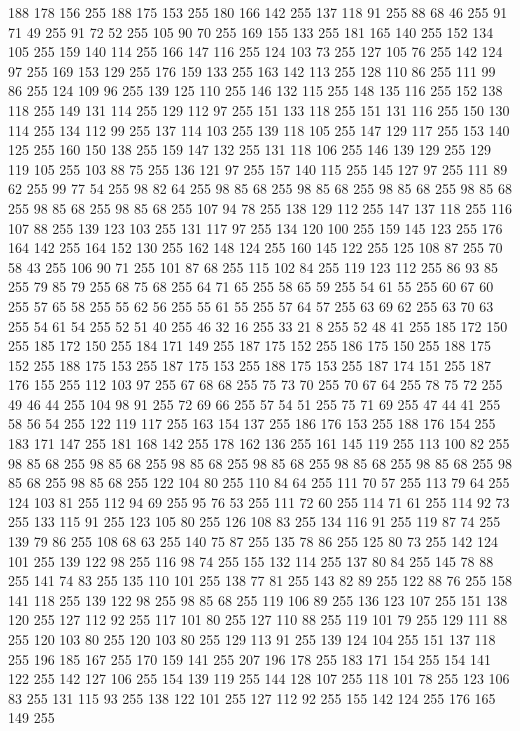 188 178 156 255 188 175 153 255 180 166 142 255 137 118 91 255 88 68 46 255 91 71 49 255 91 72 52 255 105 90 70 255 169 155 133 255 181 165 140 255 152 134 105 255 159 140 114 255 166 147 116 255 124 103 73 255 127 105 76 255 142 124 97 255 169 153 129 255 176 159 133 255 163 142 113 255 128 110 86 255 111 99 86 255 124 109 96 255 139 125 110 255 146 132 115 255 148 135 116 255 152 138 118 255 149 131 114 255 129 112 97 255 151 133 118 255 151 131 116 255 150 130 114 255 134 112 99 255 137 114 103 255 139 118 105 255 147 129 117 255 153 140 125 255 160 150 138 255 159 147 132 255 131 118 106 255 146 139 129 255 129 119 105 255 103 88 75 255 136 121 97 255 157 140 115 255 145 127 97 255 111 89 62 255 99 77 54 255 98 82 64 255 98 85 68 255 98 85 68 255 98 85 68 255 98 85 68 255 98 85 68 255 98 85 68 255 107 94 78 255 138 129 112 255 147 137 118 255 116 107 88 255 139 123 103 255 131 117 97 255 134 120 100 255 159 145 123 255 176 164 142 255 164 152 130 255
162 148 124 255 160 145 122 255 125 108 87 255 70 58 43 255 106 90 71 255 101 87 68 255 115 102 84 255 119 123 112 255 86 93 85 255 79 85 79 255 68 75 68 255 64 71 65 255 58 65 59 255 54 61 55 255 60 67 60 255 57 65 58 255 55 62 56 255 55 61 55 255 57 64 57 255 63 69 62 255 63 70 63 255 54 61 54 255 52 51 40 255 46 32 16 255 33 21 8 255 52 48 41 255 185 172 150 255 185 172 150 255 184 171 149 255 187 175 152 255 186 175 150 255 188 175 152 255 188 175 153 255 187 175 153 255 188 175 153 255 187 174 151 255 187 176 155 255 112 103 97 255 67 68 68 255 75 73 70 255 70 67 64 255 78 75 72 255 49 46 44 255 104 98 91 255 72 69 66 255 57 54 51 255 75 71 69 255 47 44 41 255 58 56 54 255 122 119 117 255 163 154 137 255 186 176 153 255 188 176 154 255 183 171 147 255 181 168 142 255 178 162 136 255 161 145 119 255 113 100 82 255 98 85 68 255 98 85 68 255 98 85 68 255 98 85 68 255 98 85 68 255 98 85 68 255
98 85 68 255 98 85 68 255 122 104 80 255 110 84 64 255 111 70 57 255 113 79 64 255 124 103 81 255 112 94 69 255 95 76 53 255 111 72 60 255 114 71 61 255 114 92 73 255 133 115 91 255 123 105 80 255 126 108 83 255 134 116 91 255 119 87 74 255 139 79 86 255 108 68 63 255 140 75 87 255 135 78 86 255 125 80 73 255 142 124 101 255 139 122 98 255 116 98 74 255 155 132 114 255 137 80 84 255 145 78 88 255 141 74 83 255 135 110 101 255 138 77 81 255 143 82 89 255 122 88 76 255 158 141 118 255 139 122 98 255 98 85 68 255 119 106 89 255 136 123 107 255 151 138 120 255 127 112 92 255 117 101 80 255 127 110 88 255 119 101 79 255 129 111 88 255 120 103 80 255 120 103 80 255 129 113 91 255 139 124 104 255 151 137 118 255 196 185 167 255 170 159 141 255 207 196 178 255 183 171 154 255 154 141 122 255 142 127 106 255 154 139 119 255 144 128 107 255 118 101 78 255 123 106 83 255 131 115 93 255 138 122 101 255 127 112 92 255 155 142 124 255 176 165 149 255
